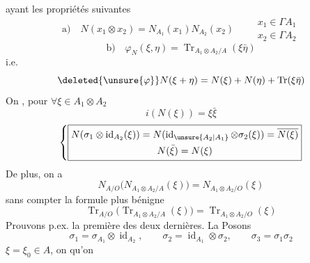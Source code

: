 ayant les propriétés suivantes
\[
\text{a)}\quad N(x_1\otimes x_2)=N_{A_1}(x_1)N_{A_2}(x_2)
\qquad\begin{gathered}x_1\in\Gamma A_1\\x_2\in\Gamma A_2\end{gathered}
\]
\[
\text{b)}\quad \varphi_N(\xi,\eta)=\operatorname{Tr}_{A_1\otimes A_2/A}(\xi\bar\eta)
\]
i.e.
\[
 \deleted{\unsure{\varphi}}N(\xi+\eta)=N(\xi)+N(\eta)+\operatorname{Tr}(\xi\bar\eta)
\]
On , pour $\forall\xi\in A_1\otimes A_2$
\[
 \boxed{i(N(\xi))=\xi\bar\xi}
\]
\[
\left\{\boxed{\begin{gathered}
 N(\sigma_1\otimes\operatorname{id}_{A_2}(\xi))=N(\operatorname{id}_{\unsure{A_2|A_1}}\otimes\sigma_2(\xi))=\overline{N(\xi)}\\
 N(\bar\xi)=N(\xi)
\end{gathered}}\right.
\]
De plus, on a
\[
 \boxed{N_{A/O}\bigl(N_{A_1\otimes A_2/A}(\xi)\bigr)=N_{A_1\otimes A_2/O}(\xi)}
\]
sans compter la formule plus bénigne
\[
 \boxed{\operatorname{Tr}_{A/O}\bigl(\operatorname{Tr}_{A_1\otimes A_2/A}(\xi)\bigr)=\operatorname{Tr}_{A_1\otimes A_2/O}(\xi)}
\]
Prouvons p.ex. la première des deux dernières. La 
Posons
\[
 \sigma_1=\sigma_{A_1}\otimes\operatorname{id}_{A_2},\qquad
 \sigma_2=\operatorname{id}_{A_1}\otimes\sigma_2,
 \qquad\sigma_3=\sigma_1\sigma_2
\]
\deleted{\unsure{\xi}} $\xi=\xi_0\in A$, 
on  qu'on 
